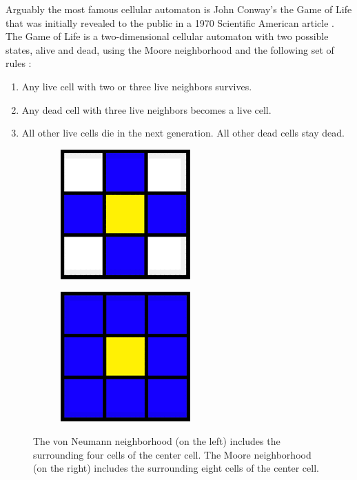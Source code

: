 \documentclass[12pt]{article}
\numberwithin{figure}{section} %
\begin{document}
Arguably the most famous cellular automaton is John Conway’s the Game of Life that was initially revealed to the public in a 1970 Scientific American article \cite{Scientific American}. The Game of Life is a two-dimensional cellular automaton with two possible states, alive and dead, using the Moore neighborhood and the following set of rules \cite{The Game of Life}: 
\begin{enumerate}[topsep=0pt,itemsep=-1ex,partopsep=1ex,parsep=1ex]
\item Any live cell with two or three live neighbors survives. 
\item Any dead cell with three live neighbors becomes a live cell. 
\item All other live cells die in the next generation. All other dead cells stay dead. 
\end{enumerate}

\begin{figure}[H]
	\begin{subfigure}{0.48\textwidth}
     		\centering
     		\includegraphics[width=.6\linewidth]{Section1/1}
   	\end{subfigure}\hfill
   	\begin{subfigure}{0.48\textwidth}
     		\centering
     		\includegraphics[width=.6\linewidth]{Section1/2}
   	\end{subfigure}
   	\caption[Neighborhood configuration]{The von Neumann neighborhood (on the left) includes the surrounding four cells of the center cell. The Moore neighborhood (on the right) includes the surrounding eight cells of the center cell.}
   	\vspace{-1.5em}
   	\label{fig:Neighborhood configuration}
\end{figure}
\end{document}
